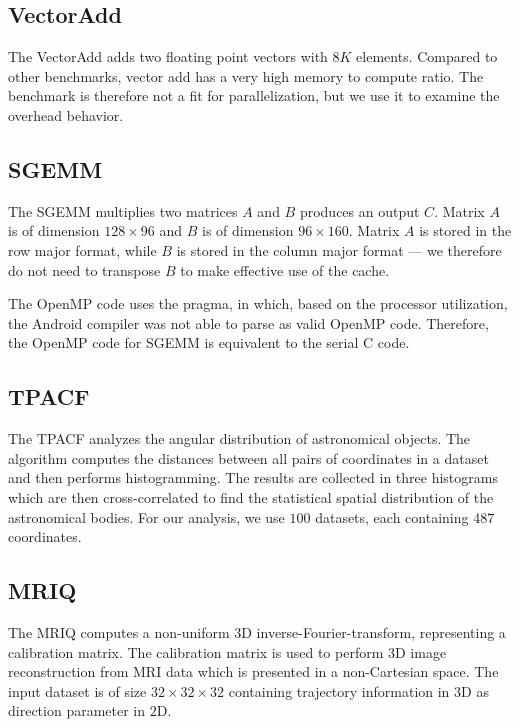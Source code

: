 \subsection{VectorAdd}

The VectorAdd adds two floating point vectors with $8K$ elements.
Compared to other benchmarks, vector add has a very high memory to compute ratio.
The benchmark is therefore not a fit for parallelization, but we use it to examine
  the overhead behavior.

\subsection{SGEMM}

The SGEMM multiplies two matrices $A$ and $B$ produces an output $C$.
Matrix $A$ is of dimension $128 \times 96$ and $B$ is of dimension $96 \times 160$.
Matrix $A$ is stored in the row major format, while $B$ is stored in the column major format ---
	we therefore do not need to transpose $B$ to make effective use of the cache.

The OpenMP code uses the 
	pragma, in which, based on the processor utilization,
	the Android compiler was not able to parse as valid OpenMP code.
Therefore, the OpenMP code for SGEMM is equivalent to the serial C code.

\subsection{TPACF}

The TPACF analyzes the angular distribution of astronomical objects.
The algorithm computes the distances between all pairs of coordinates in a dataset
	and then performs histogramming.
The results are collected in three histograms which are then cross-correlated to find
	the statistical spatial distribution of the astronomical bodies.
For our analysis, we use $100$ datasets, each containing $487$ coordinates.

\subsection{MRIQ}

The MRIQ computes a non-uniform 3D inverse-Fourier-transform, representing a calibration matrix.
The calibration matrix is used to perform 3D image reconstruction from MRI data which is 
	presented in a non-Cartesian space.
The input dataset is of size $32 \times 32 \times 32$ containing trajectory information in $3$D
	as direction parameter in $2$D.


